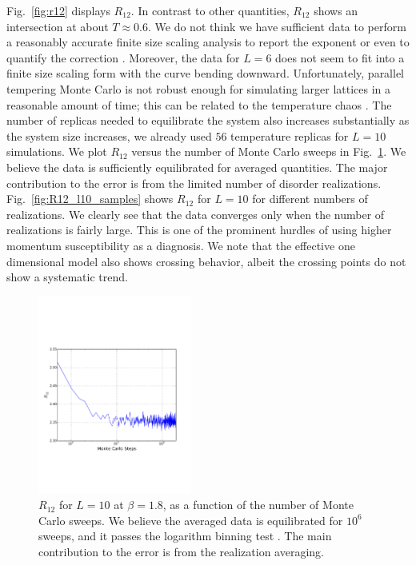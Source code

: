 \documentclass[aps,prb,twocolumn,showpacs,superscriptaddress]{revtex4}
\begin{document}
Fig.~\ref{fig:r12} displays $R_{12}$. In contrast to other quantities, $R_{12}$ shows an intersection 
at about $T \approx 0.6$. We do not think we have sufficient data to perform a reasonably accurate finite size 
scaling analysis to report the exponent or even to quantify the correction \cite{Hasenbusch-etal-2008}.
Moreover, the data for $L=6$ does not seem to fit into a finite size scaling form with the curve bending downward.
Unfortunately, parallel tempering Monte Carlo is not robust enough for simulating larger lattices in a reasonable 
amount of time; this can be related to the temperature chaos \cite{Ritort-1994,Fernandez-etal-2013,Katzgraber-etal-2007}. The number of replicas needed to equilibrate the system also 
increases substantially as the system size increases, we already used $56$ temperature 
replicas for $L=10$ simulations. We plot $R_{12}$ versus the number of Monte 
Carlo sweeps in Fig.~\ref{fig:MCsteps}. We believe the data is sufficiently equilibrated for averaged quantities.
The major contribution to the error is from the limited number of disorder realizations. Fig.~\ref{fig:R12_l10_samples} shows $R_{12}$ 
for $L=10$ for different numbers of realizations. We clearly see that the data converges only when the number of realizations is fairly large.
This is one of the prominent hurdles of using higher momentum susceptibility as a diagnosis. 
We note that the effective one dimensional model also shows crossing behavior,
albeit the crossing points do not show a systematic trend\cite{Larson-etal-2013}.

\begin{figure}[ht]
  \includegraphics[width=0.45\textwidth]{img/eq_l10.pdf}
  \caption{\label{fig:MCsteps} $R_{12}$ for $L=10$ at $\beta=1.8$, as a function of the 
number of Monte Carlo sweeps.  We believe the averaged data is equilibrated 
for $10^6$  sweeps, and it passes the logarithm binning 
test \cite{Alvarez-etal-2010}. The main contribution to the error is from the realization 
averaging.}
\end{figure}
\end{document}
